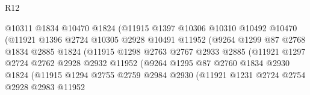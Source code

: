 \begin{lexlean}{R12}
\begin{coremodule}
                                @10311
                                @1834
                                @10470
                                @1824
                                (@11915
                                  @1397
                                  @10306
                                  @10310
                                  @10492
                                  @10470
                                  (@11921
                                    @1396
                                    @2724
                                    @10305
                                    @2928
                                    @10491
                                    @11952
                                    (@9264
                                      @1299
                                      @87
                                      @2768
                                      @1834
                                      @2885
                                      @1824
                                      (@11915
                                        @1298
                                        @2763
                                        @2767
                                        @2933
                                        @2885
                                        (@11921
                                          @1297
                                          @2724
                                          @2762
                                          @2928
                                          @2932
                                          @11952
                                          (@9264
                                            @1295
                                            @87
                                            @2760
                                            @1834
                                            @2930
                                            @1824
                                            (@11915
                                              @1294
                                              @2755
                                              @2759
                                              @2984
                                              @2930
                                              (@11921
                                                @1231
                                                @2724
                                                @2754
                                                @2928
                                                @2983
                                                @11952

\end{coremodule}
\end{lexlean}
